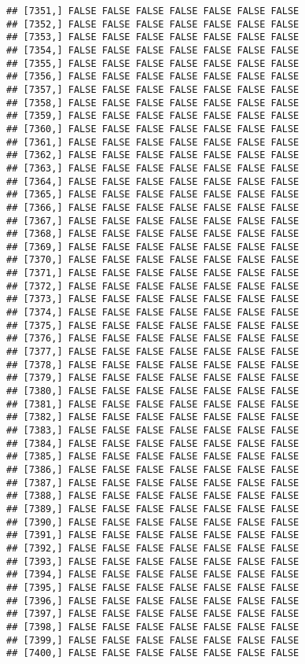 \documentclass[
]{article}
\begin{document}
\begin{verbatim}
## [7351,] FALSE FALSE FALSE FALSE FALSE FALSE FALSE
## [7352,] FALSE FALSE FALSE FALSE FALSE FALSE FALSE
## [7353,] FALSE FALSE FALSE FALSE FALSE FALSE FALSE
## [7354,] FALSE FALSE FALSE FALSE FALSE FALSE FALSE
## [7355,] FALSE FALSE FALSE FALSE FALSE FALSE FALSE
## [7356,] FALSE FALSE FALSE FALSE FALSE FALSE FALSE
## [7357,] FALSE FALSE FALSE FALSE FALSE FALSE FALSE
## [7358,] FALSE FALSE FALSE FALSE FALSE FALSE FALSE
## [7359,] FALSE FALSE FALSE FALSE FALSE FALSE FALSE
## [7360,] FALSE FALSE FALSE FALSE FALSE FALSE FALSE
## [7361,] FALSE FALSE FALSE FALSE FALSE FALSE FALSE
## [7362,] FALSE FALSE FALSE FALSE FALSE FALSE FALSE
## [7363,] FALSE FALSE FALSE FALSE FALSE FALSE FALSE
## [7364,] FALSE FALSE FALSE FALSE FALSE FALSE FALSE
## [7365,] FALSE FALSE FALSE FALSE FALSE FALSE FALSE
## [7366,] FALSE FALSE FALSE FALSE FALSE FALSE FALSE
## [7367,] FALSE FALSE FALSE FALSE FALSE FALSE FALSE
## [7368,] FALSE FALSE FALSE FALSE FALSE FALSE FALSE
## [7369,] FALSE FALSE FALSE FALSE FALSE FALSE FALSE
## [7370,] FALSE FALSE FALSE FALSE FALSE FALSE FALSE
## [7371,] FALSE FALSE FALSE FALSE FALSE FALSE FALSE
## [7372,] FALSE FALSE FALSE FALSE FALSE FALSE FALSE
## [7373,] FALSE FALSE FALSE FALSE FALSE FALSE FALSE
## [7374,] FALSE FALSE FALSE FALSE FALSE FALSE FALSE
## [7375,] FALSE FALSE FALSE FALSE FALSE FALSE FALSE
## [7376,] FALSE FALSE FALSE FALSE FALSE FALSE FALSE
## [7377,] FALSE FALSE FALSE FALSE FALSE FALSE FALSE
## [7378,] FALSE FALSE FALSE FALSE FALSE FALSE FALSE
## [7379,] FALSE FALSE FALSE FALSE FALSE FALSE FALSE
## [7380,] FALSE FALSE FALSE FALSE FALSE FALSE FALSE
## [7381,] FALSE FALSE FALSE FALSE FALSE FALSE FALSE
## [7382,] FALSE FALSE FALSE FALSE FALSE FALSE FALSE
## [7383,] FALSE FALSE FALSE FALSE FALSE FALSE FALSE
## [7384,] FALSE FALSE FALSE FALSE FALSE FALSE FALSE
## [7385,] FALSE FALSE FALSE FALSE FALSE FALSE FALSE
## [7386,] FALSE FALSE FALSE FALSE FALSE FALSE FALSE
## [7387,] FALSE FALSE FALSE FALSE FALSE FALSE FALSE
## [7388,] FALSE FALSE FALSE FALSE FALSE FALSE FALSE
## [7389,] FALSE FALSE FALSE FALSE FALSE FALSE FALSE
## [7390,] FALSE FALSE FALSE FALSE FALSE FALSE FALSE
## [7391,] FALSE FALSE FALSE FALSE FALSE FALSE FALSE
## [7392,] FALSE FALSE FALSE FALSE FALSE FALSE FALSE
## [7393,] FALSE FALSE FALSE FALSE FALSE FALSE FALSE
## [7394,] FALSE FALSE FALSE FALSE FALSE FALSE FALSE
## [7395,] FALSE FALSE FALSE FALSE FALSE FALSE FALSE
## [7396,] FALSE FALSE FALSE FALSE FALSE FALSE FALSE
## [7397,] FALSE FALSE FALSE FALSE FALSE FALSE FALSE
## [7398,] FALSE FALSE FALSE FALSE FALSE FALSE FALSE
## [7399,] FALSE FALSE FALSE FALSE FALSE FALSE FALSE
## [7400,] FALSE FALSE FALSE FALSE FALSE FALSE FALSE

\end{verbatim}
\end{document}
